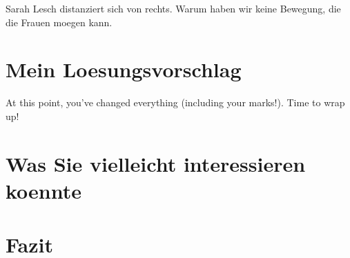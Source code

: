 \documentclass{turabian-researchpaper}
\begin{document}
Sarah Lesch distanziert sich von rechts. Warum haben wir keine Bewegung, die die Frauen moegen kann.

\section{Mein Loesungsvorschlag}

At this point, you've changed everything (including your marks!). Time to wrap up!

\section{Was Sie vielleicht interessieren koennte}


\section{Fazit}


\clearpage
\printbibliography
\end{document}
